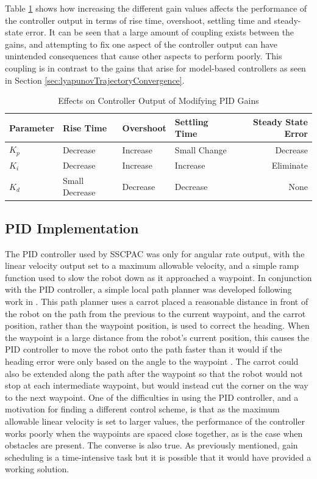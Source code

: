 Table \ref{tab:PIDGainEffects} shows how increasing the different gain values affects the performance of the controller output in terms of rise time, overshoot, settling time and steady-state error. It can be seen that a large amount of coupling exists between the gains,  and attempting to fix one aspect of the controller output can have unintended consequences that cause other aspects to perform poorly. This coupling is in contrast to the gains that arise for model-based controllers as seen in Section \ref{sec:lyapunovTrajectoryConvergence}.

\begin{table}[ht!]
\caption{Effects on Controller Output of Modifying PID Gains}
\small
\centering
\begin{tabular}{@{}llllr@{}} \toprule
Parameter    & Rise Time      & Overshoot & Settling Time & Steady State Error \\ \midrule
$K_p$        & Decrease       & Increase  & Small Change  & Decrease \\
$K_i$        & Decrease       & Increase  & Increase      & Eliminate \\
$K_d$        & Small Decrease & Decrease  & Decrease      & None \\ \bottomrule
\end{tabular}
\label{tab:PIDGainEffects}
\end{table}

\subsection{PID Implementation}
The PID controller used by SSCPAC was only for angular rate output, with the linear velocity output set to a maximum allowable velocity, and a simple ramp function used to slow the robot down as it approached a waypoint. In conjunction with the PID controller, a simple local path planner was developed following work in \cite{Hogg02}. This path planner uses a carrot placed a reasonable distance in front of the robot on the path from the previous to the current waypoint, and the carrot position, rather than the waypoint position, is used to correct the heading. When the waypoint is a large distance from the robot's current position, this causes the PID controller to move the robot onto the path faster than it would if the heading error were only based on the angle to the waypoint . The carrot could also be extended along the path after the waypoint so that the robot would not stop at each intermediate waypoint, but would instead cut the corner on the way to the next waypoint. One of the difficulties in using the PID controller, and a motivation for finding a different control scheme, is that as the maximum allowable linear velocity is set to larger values, the performance of the controller works poorly when the waypoints are spaced close together, as is the case when obstacles are present. The converse is also true. As previously mentioned, gain scheduling is a time-intensive task but it is possible that it would have provided a working solution.

